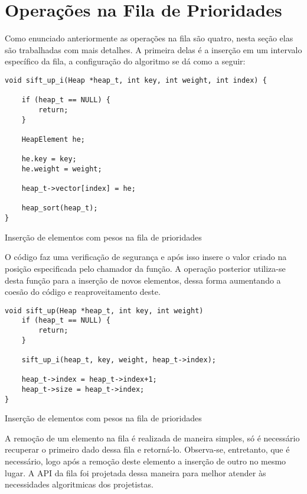 \documentclass[a4paper, 12pt]{report}
\begin{document}
\chapter{Operações na Fila de Prioridades}
\label{sec-3-1}

Como enunciado anteriormente as operações na fila são quatro, nesta seção elas
são trabalhadas com mais detalhes. A primeira delas é a inserção em um
intervalo específico da fila, a configuração do algoritmo se dá como a seguir:

\begin{listing}[H]
\begin{verbatim}
void sift_up_i(Heap *heap_t, int key, int weight, int index) {

    if (heap_t == NULL) {
        return;
    }

    HeapElement he;

    he.key = key;
    he.weight = weight;

    heap_t->vector[index] = he;

    heap_sort(heap_t);
}
\end{verbatim}
\caption{Inserção de elementos com pesos na fila de prioridades}
\end{listing}

O código faz uma verificação de segurança e após isso insere o valor criado
na posição especificada pelo chamador da função. A operação posterior
utiliza-se desta função para a inserção de novos elementos, dessa forma
aumentando a coesão do código e reaproveitamento deste.

\begin{listing}[H]
\begin{verbatim}
void sift_up(Heap *heap_t, int key, int weight)
    if (heap_t == NULL) {
        return;
    }

    sift_up_i(heap_t, key, weight, heap_t->index);

    heap_t->index = heap_t->index+1;
    heap_t->size = heap_t->index;
}
\end{verbatim}
\caption{Inserção de elementos com pesos na fila de prioridades}
\end{listing}

A remoção de um elemento na fila é realizada de maneira simples, só é
necessário recuperar o primeiro dado dessa fila e retorná-lo. Observa-se,
entretanto, que é necessário, logo após a remoção deste elemento a inserção
de outro no mesmo lugar. A API da fila foi projetada dessa maneira para
melhor atender às necessidades algoritmicas dos projetistas.
\end{document}
